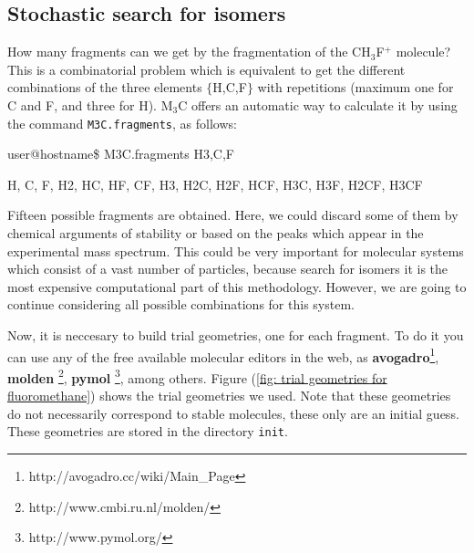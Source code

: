 \documentclass[a4paper,12pt]{article}
\begin{document}
\subsection{Stochastic search for isomers}

How many fragments can we get by the fragmentation of the CH$_3$F$^+$ molecule? This is a combinatorial problem which 
is equivalent to get the different combinations of the three elements $\{$H,C,F$\}$ with repetitions (maximum one for
C and F, and three for H). M$_3$C offers an automatic way to calculate it by using the command \texttt{M3C.fragments}, as follows:
\begin{shellexec}
user@hostname\$ M3C.fragments H3,C,F

H, C, F, H2, HC, HF, CF, H3, H2C, H2F, HCF, H3C, H3F, H2CF, H3CF
\end{shellexec}
Fifteen possible fragments are obtained.
Here, we could discard some of them by chemical arguments of stability or based on the peaks which appear in the 
experimental mass spectrum. This could be very important for molecular systems which consist of a vast number of 
particles, because search for isomers it is the most expensive computational part of this methodology. However, we are 
going to continue considering all possible combinations for this system.

Now, it is neccesary to build trial geometries, one for each fragment. To do it you can use any of the free available
molecular editors in the web, as \textbf{avogadro}\footnote{http://avogadro.cc/wiki/Main\_Page}, \textbf{molden} 
\footnote{http://www.cmbi.ru.nl/molden/}, \textbf{pymol} \footnote{http://www.pymol.org/}, among others.
Figure (\ref{fig: trial geometries for fluoromethane}) shows the trial geometries we used. Note that these geometries
do not necessarily correspond to stable molecules, these only are an initial guess. These geometries are stored
in the directory \texttt{init}.

\end{document}
